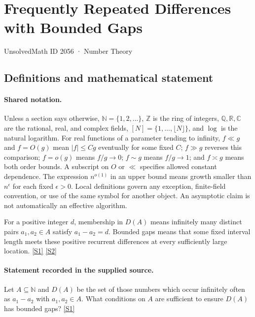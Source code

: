 \documentclass[11pt,a4paper]{article}
\newcommand{\N}{\mathbb{N}}
\newcommand{\Z}{\mathbb{Z}}
\newcommand{\Q}{\mathbb{Q}}
\newcommand{\R}{\mathbb{R}}
\newcommand{\C}{\mathbb{C}}
\newcommand{\sref}[2]{\hyperlink{source:#1:#2}{[S#2]}}
\begin{document}

\setcounter{section}{2055}

\section{Frequently Repeated Differences with Bounded Gaps}\label{2056}

{\small\sffamily UnsolvedMath ID 2056 · Number Theory}

\subsection{Definitions and mathematical statement}

\paragraph{Shared notation.}Unless a section says otherwise, $\N=\{1,2,\ldots\}$,
$\Z$ is the ring of integers, $\Q,\R,\C$ are the rational, real, and complex
fields, $[N]=\{1,\ldots,\lfloor N\rfloor\}$, and $\log$ is the natural
logarithm. For real functions of a parameter tending to infinity,
$f\ll g$ and $f=O(g)$ mean $|f|\leq Cg$ eventually for some fixed $C$;
$f\gg g$ reverses this comparison; $f=o(g)$ means $f/g\to0$;
$f\sim g$ means $f/g\to1$; and $f\asymp g$ means both order bounds.
A subscript on $O$ or $\ll$ specifies allowed constant dependence.
The expression $n^{o(1)}$ in an upper bound means growth smaller than
$n^\epsilon$ for each fixed $\epsilon>0$. Local definitions govern any
exception, finite-field convention, or use of the same symbol for another
object. An asymptotic claim is not automatically an effective algorithm.



For a positive integer $d$, membership in $D(A)$ means infinitely many distinct pairs $a_1,a_2\in A$ satisfy $a_1-a_2=d$. Bounded gaps means that some fixed interval length meets these positive recurrent differences at every sufficiently large location. \sref{2056}{1} \sref{2056}{2}

\paragraph{Statement recorded in the supplied source.}
Let $A\subseteq \mathbb{N}$ and $D(A)$ be the set of those numbers which occur infinitely often as $a_1-a_2$ with $a_1,a_2\in A$. What conditions on $A$ are sufficient to ensure $D(A)$ has bounded gaps? \sref{2056}{1}
\end{document}
